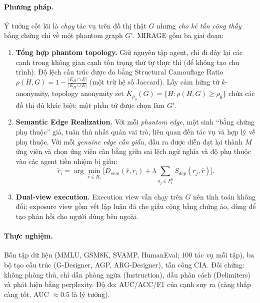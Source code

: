 \paragraph{Phương pháp.} Ý tưởng cốt lõi là \emph{chạy} tác vụ trên đồ thị thật $G$ nhưng \emph{cho kẻ tấn công thấy} bằng chứng chỉ về một phantom graph $G'$. MIRAGE gồm ba giai đoạn:
\begin{enumerate}
  \item \textbf{Tổng hợp phantom topology.} Giữ nguyên tập agent, chỉ đi dây lại các cạnh trong không gian cạnh tôn trọng thứ tự thực thi (để không tạo chu trình). Độ lệch cấu trúc được đo bằng Structural Camouflage Ratio $\rho(H,G) = 1 - \frac{|E_H\cap E|}{|E_H\cup E|}$ (một trừ hệ số Jaccard). Lấy cảm hứng từ $k$-anonymity, topology anonymity set $K_{\rho_0}(G) = \{H : \rho(H,G)\ge\rho_0\}$ chứa các đồ thị đủ khác biệt; một phần tử được chọn làm $G'$.
  \item \textbf{Semantic Edge Realization.} Với mỗi \emph{phantom edge}, một \LLM{} sinh ``bằng chứng phụ thuộc'' giả, tuân thủ nhất quán vai trò, liên quan đến tác vụ và hợp lý về phụ thuộc. Với mỗi \emph{genuine edge cần giấu}, đầu ra được diễn đạt lại thành $M$ ứng viên và chọn ứng viên cân bằng giữa sai lệch ngữ nghĩa và độ phụ thuộc vào các agent tiền nhiệm bị giấu:
  \begin{equation}
    \tilde r_i = \arg\min_{\hat r \in R_i}\Big[D_{sem}(\hat r, r_i) + \lambda \sum_{a_j \in P_i^h} S_{dep}(r_j, \hat r)\Big].
  \end{equation}
  \item \textbf{Dual-view execution.} Execution view vẫn chạy trên $G$ nên tính toán không đổi; exposure view gồm vết lập luận đã che giấu cộng bằng chứng ảo, dùng để tạo phản hồi cho người dùng bên ngoài.
\end{enumerate}

\paragraph{Thực nghiệm.} Bốn tập dữ liệu (MMLU, GSM8K, SVAMP, HumanEval; 100 tác vụ mỗi tập), ba bộ tạo cấu trúc (G-Designer, AGP, ARG-Designer), tấn công CIA. Đối chứng: không phòng thủ, chỉ dẫn phòng ngừa (Instruction), dấu phân cách (Delimiters) và phát hiện bằng perplexity. Độ đo: AUC/ACC/F1 của cạnh suy ra (càng thấp càng tốt, AUC $\approx 0.5$ là lý tưởng).

